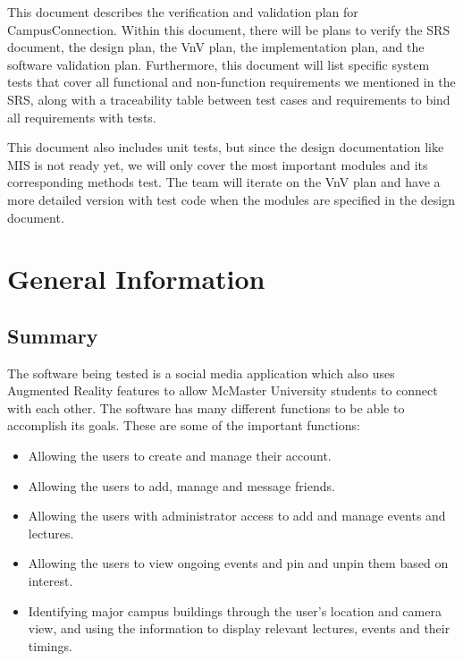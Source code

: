 \documentclass[12pt, titlepage]{article}
\begin{document}
\newpage


This document describes the verification and validation plan for CampusConnection.  Within this document, there will be plans to verify the SRS document, the design plan, the VnV plan, the implementation plan, and the software validation plan.  Furthermore, this document will list specific system tests that cover all functional and non-function requirements we mentioned in the SRS, along with a traceability table between test cases and requirements to bind all requirements with tests. 

This document also includes unit tests, but since the design documentation like MIS is not ready yet, we will only cover the most important modules and its corresponding methods test. The team will iterate on the VnV plan and have a more detailed version with test code when the modules are specified in the design document.

\section{General Information}

\subsection{Summary}
  
The software being tested is a social media application which also uses Augmented Reality features to allow McMaster University students to connect with each other. The software has many different functions to be able to accomplish its goals. These are some of the important functions:

 \begin{itemize}
     \item  Allowing the users to create and manage their account.

     \item  Allowing the users to add, manage and message friends.

     \item  Allowing the users with administrator access to add and manage events and lectures.

     \item  Allowing the users to view ongoing events and pin and unpin them based on interest.

     \item  Identifying major campus buildings through the user's location and camera view, and using the information to display relevant lectures, events and their timings.

 \end{itemize}
\end{document}
